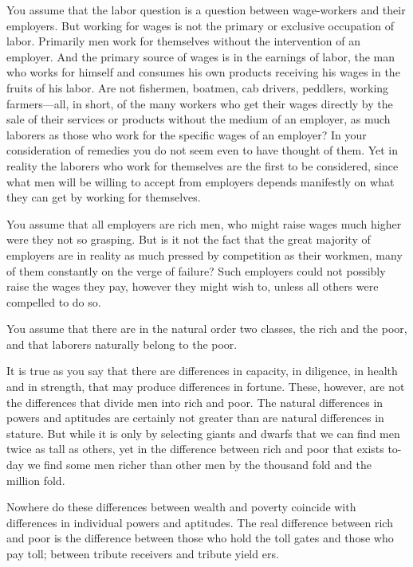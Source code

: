 \documentclass{book}
\begin{document}
You assume that the labor question is a question between wage-workers and their employers. But working for wages is not the primary or exclusive occupation of labor. Primarily men work for themselves without the intervention of an employer. And the primary source of wages is in the earnings of labor, the man who works for himself and consumes his own products receiving his wages in the fruits of his labor. Are not fishermen, boatmen, cab drivers, peddlers, working farmers—all, in short, of the many workers who get their wages directly by the sale of their services or products without the medium of an employer, as much laborers as those who work for the specific wages of an employer? In your consideration of remedies you do not seem even to have thought of them. Yet in reality the laborers who work for themselves are the first to be considered, since what men will be willing to accept from employers depends manifestly on what they can get by working for themselves.

You assume that all employers are rich men, who might raise wages much higher were they not so grasping. But is it not the fact that the great majority of employers are in reality as much pressed by competition as their workmen, many of them constantly on the verge of failure? Such employers could not possibly raise the wages they pay, however they might wish to, unless all others were compelled to do so.

You assume that there are in the natural order two classes, the rich and the poor, and that laborers naturally belong to the poor.

It is true as you say that there are differences in capacity, in diligence, in health and in strength, that may produce differences in fortune. These, however, are not the differences that divide men into rich and poor. The natural differences in powers and aptitudes are certainly not greater than are natural differences in stature. But while it is only by selecting giants and dwarfs that we can find men twice as tall as others, yet in the difference between rich and poor that exists to-day we find some men richer than other men by the thousand fold and the million fold.

Nowhere do these differences between wealth and poverty coincide with differences in individual powers and aptitudes. The real difference between rich and poor is the difference between those who hold the toll gates and those who pay toll; between tribute receivers and tribute yield ers.
\end{document}
